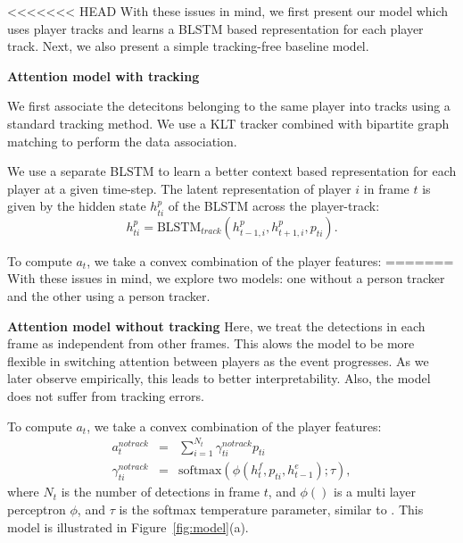 {<<<<<<< HEAD
With these issues in mind, we first present our model which uses player tracks
and learns a BLSTM based representation for each player track. Next, we also
present a simple tracking-free baseline model.

\noindent \textbf{Attention model with tracking}

We first associate the detecitons
belonging to the same player into tracks using a standard
tracking method. We use a KLT tracker combined with
bipartite graph matching \cite{} to perform the data association.

We use a separate BLSTM to learn a better context based
representation for each player at a given time-step.
The latent representation of player $i$ in frame $t$ is
given by the hidden state
$h_{ti}^p$ of the BLSTM across the player-track:
\[
  h_{ti}^p = \mbox{BLSTM}_{track}(h_{t-1,i}^p, h_{t+1,i}^p, p_{ti}).
\]

To compute $a_t$, we take a convex combination of the player features:
=======
With these issues in mind, we explore two models:
one without a person  tracker and the other using a person tracker.


\noindent \textbf{Attention model without tracking}
Here, we treat the detections in each frame as independent from other
frames.  This alows the model to be more flexible in switching attention
between players as the event progresses.  As we later observe empirically, this
leads to better interpretability.  Also, the model does not suffer from
tracking errors.

To compute $a_t$, we take a convex combination of the player features:
\begin{eqnarray} 
\label{eq:notrack}
  a_t^{notrack} & = & \sum_{i=1}^{N_t} \gamma_{ti}^{notrack} p_{ti} 
\\ \nonumber
  \gamma_{ti}^{notrack} & = & \text{softmax} \left(\phi\left(h^f_t, p_{ti}, h^e_{t-1}\right); \tau\right),
\end{eqnarray}
where $N_t$ is the number of detections in frame $t$,
and $\phi()$ is a 
multi layer perceptron $\phi$, 
and $\tau$ is the softmax temperature parameter,
similar to
\cite{Bahdnau_arxiv14}. 
This model is illustrated in Figure~\ref{fig:model}(a).

\begin{figure}[t!]
\begin{center}


\end{center}
\end{figure}}
